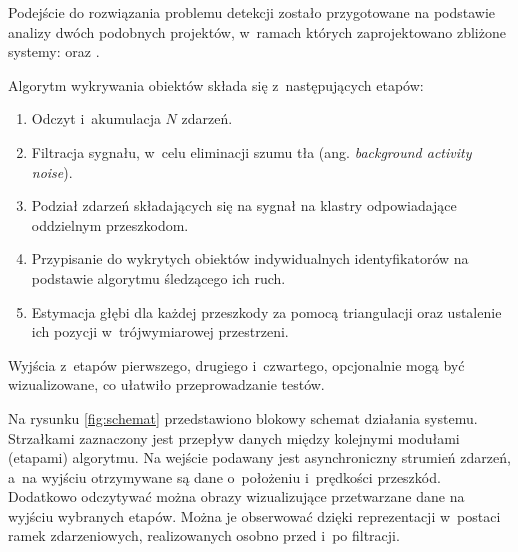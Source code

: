 

Podejście do rozwiązania problemu detekcji zostało przygotowane na podstawie analizy dwóch podobnych projektów, w~ramach których zaprojektowano zbliżone systemy: \cite{dynamic_obstacle} oraz \cite{night_obstacle}.

\vspace{11px}
Algorytm wykrywania obiektów składa się z~następujących etapów:
\begin{enumerate}
    \item Odczyt i~akumulacja $N$ zdarzeń.
    \item Filtracja sygnału, w~celu eliminacji szumu tła (ang. \textit{background activity noise}).
    \item Podział zdarzeń składających się na sygnał na klastry odpowiadające oddzielnym przeszkodom.
    \item Przypisanie do wykrytych obiektów indywidualnych identyfikatorów na podstawie algorytmu śledzącego ich ruch.
    \item Estymacja głębi dla każdej przeszkody za pomocą triangulacji oraz ustalenie ich pozycji w~trójwymiarowej przestrzeni.
\end{enumerate}

Wyjścia z~etapów pierwszego, drugiego i~czwartego, opcjonalnie mogą być wizualizowane, co ułatwiło przeprowadzanie testów.



Na rysunku \ref{fig:schemat} przedstawiono blokowy schemat działania systemu. Strzałkami zaznaczony jest przepływ danych między kolejnymi modułami (etapami) algorytmu. Na wejście podawany jest asynchroniczny strumień zdarzeń, a~na wyjściu otrzymywane są dane o~położeniu i~prędkości przeszkód. Dodatkowo odczytywać można obrazy wizualizujące przetwarzane dane na wyjściu wybranych etapów. Można je obserwować dzięki reprezentacji w~postaci ramek zdarzeniowych, realizowanych osobno przed i~po filtracji.

